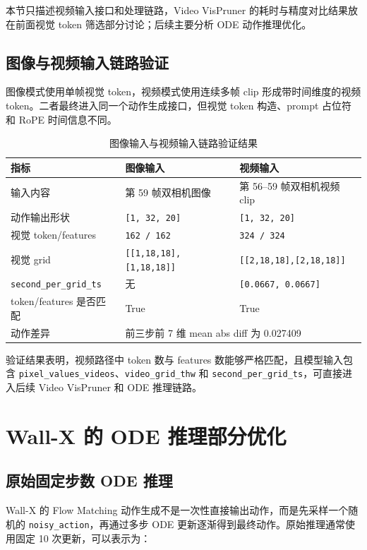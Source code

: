 \documentclass[UTF8,a4paper,12pt]{ctexart}
\begin{document}
本节只描述视频输入接口和处理链路，Video VisPruner 的耗时与精度对比结果放在前面视觉 token 筛选部分讨论；后续主要分析 ODE 动作推理优化。

\subsection{图像与视频输入链路验证}

图像模式使用单帧视觉 token，视频模式使用连续多帧 clip 形成带时间维度的视频 token。二者最终进入同一个动作生成接口，但视觉 token 构造、prompt 占位符和 RoPE 时间信息不同。

\begin{table}[htbp]
\centering
\small
\caption{图像输入与视频输入链路验证结果}
\begin{tabular}{lll}
\toprule
指标 & 图像输入 & 视频输入 \\
\midrule
输入内容 & 第 59 帧双相机图像 & 第 56--59 帧双相机视频 clip \\
动作输出形状 & \texttt{[1, 32, 20]} & \texttt{[1, 32, 20]} \\
视觉 token/features & \texttt{162 / 162} & \texttt{324 / 324} \\
视觉 grid & \texttt{[[1,18,18],[1,18,18]]} & \texttt{[[2,18,18],[2,18,18]]} \\
\texttt{second\_per\_grid\_ts} & 无 & \texttt{[0.0667, 0.0667]} \\
token/features 是否匹配 & True & True \\
动作差异 & \multicolumn{2}{l}{前三步前 7 维 mean abs diff 为 0.027409} \\
\bottomrule
\end{tabular}
\end{table}

验证结果表明，视频路径中 token 数与 features 数能够严格匹配，且模型输入包含 \texttt{pixel\_values\_videos}、\texttt{video\_grid\_thw} 和 \texttt{second\_per\_grid\_ts}，可直接进入后续 Video VisPruner 和 ODE 推理链路。

\section{Wall-X 的 ODE 推理部分优化}

\subsection{原始固定步数 ODE 推理}

Wall-X 的 Flow Matching 动作生成不是一次性直接输出动作，而是先采样一个随机的 \texttt{noisy\_action}，再通过多步 ODE 更新逐渐得到最终动作。原始推理通常使用固定 10 次更新，可以表示为：
\end{document}

